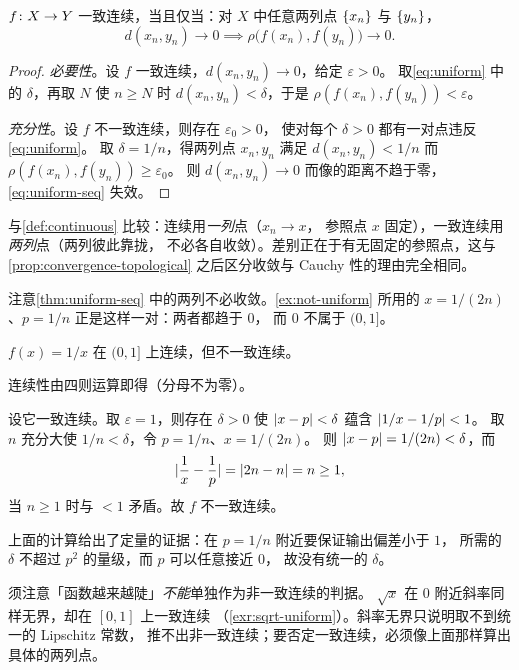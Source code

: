 \begin{theorem}[一致连续的序列判据]
  \label{thm:uniform-seq}
  \(f \colon X \to Y\) 一致连续，当且仅当：对 \(X\) 中任意两列点
  \(\{x_{n}\}\) 与 \(\{y_{n}\}\)，
  \begin{equation}
    \label{eq:uniform-seq}
    d(x_{n},y_{n}) \to 0 \implies \rho\bigl(f(x_{n}),f(y_{n})\bigr) \to 0 .
  \end{equation}
\end{theorem}

\begin{proof}
  \emph{必要性}。设 \(f\) 一致连续，\(d(x_{n},y_{n}) \to 0\)，给定 \(\varepsilon>0\)。
  取\cref{eq:uniform} 中的 \(\delta\)，再取 \(N\) 使 \(n \ge N\) 时
  \(d(x_{n},y_{n})<\delta\)，于是 \(\rho(f(x_{n}),f(y_{n}))<\varepsilon\)。

  \emph{充分性}。设 \(f\) 不一致连续，则存在 \(\varepsilon_{0}>0\)，
  使对每个 \(\delta>0\) 都有一对点违反\cref{eq:uniform}。
  取 \(\delta=1/n\)，得两列点 \(x_{n},y_{n}\) 满足 \(d(x_{n},y_{n})<1/n\)
  而 \(\rho(f(x_{n}),f(y_{n})) \ge \varepsilon_{0}\)。
  则 \(d(x_{n},y_{n}) \to 0\) 而像的距离不趋于零，\cref{eq:uniform-seq} 失效。
\end{proof}

\begin{remark}
  与\cref{def:continuous} 比较：连续用\emph{一列}点（\(x_{n} \to x\)，
  参照点 \(x\) 固定），一致连续用\emph{两列}点（两列彼此靠拢，
  不必各自收敛）。差别正在于有无固定的参照点，这与\cref{prop:convergence-topological} 之后区分收敛与 Cauchy 性的理由完全相同。

  注意\cref{thm:uniform-seq} 中的两列不必收敛。\cref{ex:not-uniform}
  所用的 \(x=1/(2n)\)、\(p=1/n\) 正是这样一对：两者都趋于 \(0\)，
  而 \(0\) 不属于 \((0,1]\)。
\end{remark}

\begin{example}[连续但不一致连续]
  \label{ex:not-uniform}
  \(f(x) = 1/x\) 在 \((0,1]\) 上连续，但不一致连续。
  \begin{worked}
    连续性由四则运算即得（分母不为零）。

    设它一致连续。取 \(\varepsilon = 1\)，则存在 \(\delta>0\) 使
    \(\lvert x-p\rvert<\delta\) 蕴含 \(\lvert1/x - 1/p\rvert < 1\)。
    取 \(n\) 充分大使 \(1/n < \delta\)，令 \(p = 1/n\)、\(x = 1/(2n)\)。
    则 \(\lvert x-p\rvert = 1/(2n) < \delta\)，而
    \begin{equation}
      \label{eq:one-over-x}
      \lvert\frac{1}{x} - \frac{1}{p}\rvert = \lvert2n - n\rvert = n \ge 1 ,
    \end{equation}
    当 \(n \ge 1\) 时与 \(<1\) 矛盾。故 \(f\) 不一致连续。

    上面的计算给出了定量的证据：在 \(p=1/n\) 附近要保证输出偏差小于 \(1\)，
    所需的 \(\delta\) 不超过 \(p^{2}\) 的量级，而 \(p\) 可以任意接近 \(0\)，
    故没有统一的 \(\delta\)。

    须注意「函数越来越陡」\emph{不能}单独作为非一致连续的判据。
    \(\sqrt{x}\) 在 \(0\) 附近斜率同样无界，却在 \([0,1]\) 上一致连续
    （\cref{exr:sqrt-uniform}）。斜率无界只说明取不到统一的 Lipschitz 常数，
    推不出非一致连续；要否定一致连续，必须像上面那样算出具体的两列点。
  \end{worked}
\end{example}


